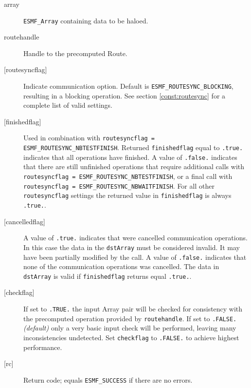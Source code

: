      \begin{description}
     \item [array]
       {\tt ESMF\_Array} containing data to be haloed.
     \item [routehandle]
       Handle to the precomputed Route.
     \item [{[routesyncflag]}]
       Indicate communication option. Default is {\tt ESMF\_ROUTESYNC\_BLOCKING},
       resulting in a blocking operation.
       See section \ref{const:routesync} for a complete list of valid settings.
     \item [{[finishedflag]}]
       \begin{sloppypar}
       Used in combination with {\tt routesyncflag = ESMF\_ROUTESYNC\_NBTESTFINISH}.
       Returned {\tt finishedflag} equal to {\tt .true.} indicates that all
       operations have finished. A value of {\tt .false.} indicates that there
       are still unfinished operations that require additional calls with
       {\tt routesyncflag = ESMF\_ROUTESYNC\_NBTESTFINISH}, or a final call with
       {\tt routesyncflag = ESMF\_ROUTESYNC\_NBWAITFINISH}. For all other {\tt routesyncflag}
       settings the returned value in {\tt finishedflag} is always {\tt .true.}.
       \end{sloppypar}
     \item [{[cancelledflag]}]
       A value of {\tt .true.} indicates that were cancelled communication
       operations. In this case the data in the {\tt dstArray} must be considered
       invalid. It may have been partially modified by the call. A value of
       {\tt .false.} indicates that none of the communication operations was
       cancelled. The data in {\tt dstArray} is valid if {\tt finishedflag} 
       returns equal {\tt .true.}.
     \item [{[checkflag]}]
       If set to {\tt .TRUE.} the input Array pair will be checked for
       consistency with the precomputed operation provided by {\tt routehandle}.
       If set to {\tt .FALSE.} {\em (default)} only a very basic input check
       will be performed, leaving many inconsistencies undetected. Set
       {\tt checkflag} to {\tt .FALSE.} to achieve highest performance.
     \item [{[rc]}]
       Return code; equals {\tt ESMF\_SUCCESS} if there are no errors.
     \end{description}
   
 
